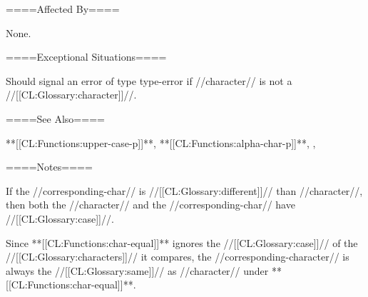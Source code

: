 ====Affected By====

None.

====Exceptional Situations====

Should signal an error of type type-error if //character// is not a //[[CL:Glossary:character]]//.

====See Also====

**[[CL:Functions:upper-case-p]]**, **[[CL:Functions:alpha-char-p]]**, {\secref\CharactersWithCase}, {\secref\ImplementationDefinedScripts}

====Notes====

If the //corresponding-char// is //[[CL:Glossary:different]]// than //character//, then both the //character// and the //corresponding-char// have //[[CL:Glossary:case]]//.

Since **[[CL:Functions:char-equal]]** ignores the //[[CL:Glossary:case]]// of the //[[CL:Glossary:characters]]// it compares, the //corresponding-character// is always the //[[CL:Glossary:same]]// as //character// under **[[CL:Functions:char-equal]]**.

